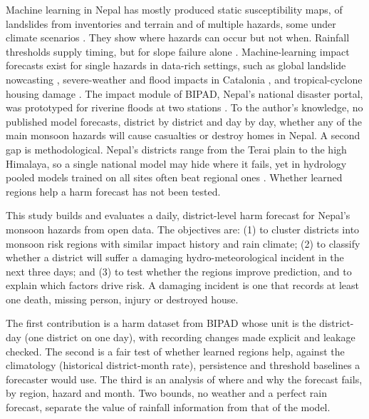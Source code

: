 \documentclass[conference]{IEEEtran}
\begin{document}
Machine learning in Nepal has mostly produced static susceptibility maps, of landslides from inventories and terrain \cite{Kincey2024} and of multiple hazards, some under climate scenarios \cite{Thapa2026,Shrestha2026}. They show where hazards can occur but not when. Rainfall thresholds supply timing, but for slope failure alone \cite{Dahal2008,Guzzetti2020}. Machine-learning impact forecasts exist for single hazards in data-rich settings, such as global landslide nowcasting \cite{Stanley2021}, severe-weather and flood impacts in Catalonia \cite{Iglesias2024,Morales2026}, and tropical-cyclone housing damage \cite{KooshkiForooshani2024}. The impact module of BIPAD, Nepal's national disaster portal, was prototyped for riverine floods at two stations \cite{UNDRR2025}. To the author's knowledge, no published model forecasts, district by district and day by day, whether any of the main monsoon hazards will cause casualties or destroy homes in Nepal. A second gap is methodological. Nepal's districts range from the Terai plain to the high Himalaya, so a single national model may hide where it fails, yet in hydrology pooled models trained on all sites often beat regional ones \cite{Kratzert2019,Fang2022}. Whether learned regions help a harm forecast has not been tested.

This study builds and evaluates a daily, district-level harm forecast for Nepal's monsoon hazards from open data. The objectives are: (1) to cluster districts into monsoon risk regions with similar impact history and rain climate; (2) to classify whether a district will suffer a damaging hydro-meteorological incident in the next three days; and (3) to test whether the regions improve prediction, and to explain which factors drive risk. A damaging incident is one that records at least one death, missing person, injury or destroyed house.

The first contribution is a harm dataset from BIPAD whose unit is the district-day (one district on one day), with recording changes made explicit and leakage checked. The second is a fair test of whether learned regions help, against the climatology (historical district-month rate), persistence and threshold baselines a forecaster would use. The third is an analysis of where and why the forecast fails, by region, hazard and month. Two bounds, no weather and a perfect rain forecast, separate the value of rainfall information from that of the model.
\end{document}
